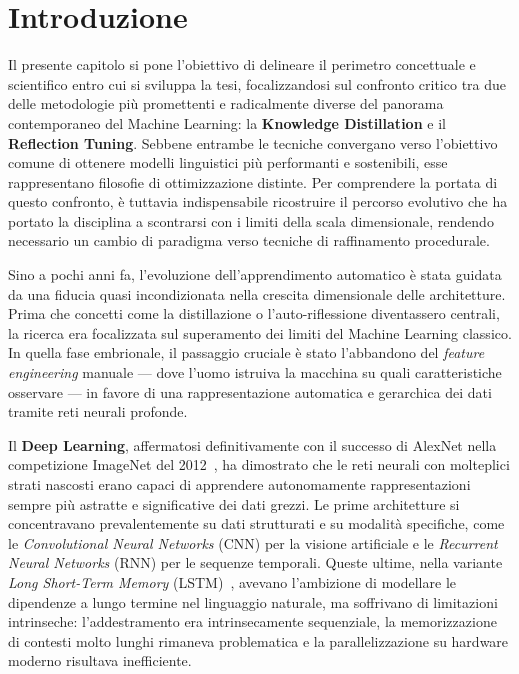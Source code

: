 
\chapter{Introduzione} 
\label{cap:1}

Il presente capitolo si pone l'obiettivo di delineare il perimetro concettuale e scientifico entro cui si sviluppa la tesi, focalizzandosi sul confronto critico tra due delle metodologie più promettenti e radicalmente diverse del panorama contemporaneo del Machine Learning: la \textbf{Knowledge Distillation} e il \textbf{Reflection Tuning}. Sebbene entrambe le tecniche convergano verso l'obiettivo comune di ottenere modelli linguistici più performanti e sostenibili, esse rappresentano filosofie di ottimizzazione distinte. Per comprendere la portata di questo confronto, è tuttavia indispensabile ricostruire il percorso evolutivo che ha portato la disciplina a scontrarsi con i limiti della scala dimensionale, rendendo necessario un cambio di paradigma verso tecniche di raffinamento procedurale.

Sino a pochi anni fa, l'evoluzione dell'apprendimento automatico è stata guidata da una fiducia quasi incondizionata nella crescita dimensionale delle architetture. Prima che concetti come la distillazione o l'auto-riflessione diventassero centrali, la ricerca era focalizzata sul superamento dei limiti del Machine Learning classico. In quella fase embrionale, il passaggio cruciale è stato l'abbandono del \textit{feature engineering} manuale — dove l'uomo istruiva la macchina su quali caratteristiche osservare — in favore di una rappresentazione automatica e gerarchica dei dati tramite reti neurali profonde.

Il \textbf{Deep Learning}, affermatosi definitivamente con il successo di AlexNet nella competizione ImageNet del 2012~\cite{krizhevsky2012imagenet}, ha dimostrato che le reti neurali con molteplici strati nascosti erano capaci di apprendere autonomamente rappresentazioni sempre più astratte e significative dei dati grezzi. Le prime architetture si concentravano prevalentemente su dati strutturati e su modalità specifiche, come le \textit{Convolutional Neural Networks} (CNN) per la visione artificiale e le \textit{Recurrent Neural Networks} (RNN) per le sequenze temporali. Queste ultime, nella variante \textit{Long Short-Term Memory} (LSTM)~\cite{hochreiter1997long}, avevano l'ambizione di modellare le dipendenze a lungo termine nel linguaggio naturale, ma soffrivano di limitazioni intrinseche: l'addestramento era intrinsecamente sequenziale, la memorizzazione di contesti molto lunghi rimaneva problematica e la parallelizzazione su hardware moderno risultava inefficiente.

